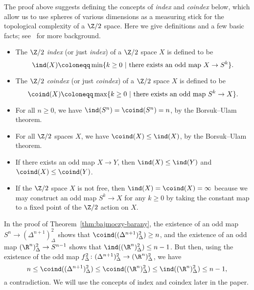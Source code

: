 \documentclass[11pt, reqno, english]{amsart}
\begin{document}
The proof above suggests defining the concepts of \emph{index} and \emph{coindex} below, which allow us to use spheres of various dimensions as a measuring stick for the topological complexity of a $\Z/2$ space.
Here we give definitions and a few basic facts; see~\cite[Chapter 5]{matousek2003using} for more background.
\begin{itemize}
\item
The \emph{$\Z/2$ index} (or just \emph{index}) of a $\Z/2$ space $X$ is defined to be
\[\ind(X)\coloneqq \min\{k\geq 0 ~|~ \text{there exists an odd map } X\to S^k\}.\]
\item
The \emph{$\Z/2$ coindex} (or just \emph{coindex}) of a $\Z/2$ space $X$ is defined to be
\[\coind(X)\coloneqq \max\{k\geq 0 ~|~ \text{there exists an odd map } S^k\to X\}.\]
\item
For all $n \ge 0$, we have $\ind(S^{n}) = \coind(S^{n}) = n$, by the Borsuk--Ulam theorem.
\item
For all $\Z/2$ spaces $X$, we have $\coind(X) \le \ind(X)$, by the Borsuk--Ulam theorem.
\item
If there exists an odd map $X \to Y$, then $\ind(X) \le \ind(Y)$ and $\coind(X) \le \coind(Y)$.
\item
If the $\Z/2$ space $X$ is not free, then $\ind(X)=\coind(X) = \infty$ because we may construct an odd map $S^{k} \to X$ for any $k \ge 0$ by taking the constant map to a fixed point of the $\Z/2$ action on $X$.
\end{itemize}
In the proof of Theorem~\ref{thm:bajmoczy-barany}, the existence of an odd map $S^{n} \to (\Delta^{n + 1})^{2}_{\Delta}$ shows that $\coind((\Delta^{n + 1})^{2}_{\Delta}) \ge n$, and the existence of an odd map $(\R^{n})^{2}_{\Delta} \to S^{n - 1}$ shows that $\ind((\R^{n})^{2}_{\Delta}) \le n - 1$.
But then, using the existence of the odd map $f^{2}_{\Delta} \colon (\Delta^{n + 1})^{2}_{\Delta} \to (\R^{n})^{2}_{\Delta}$, we have
\begin{equation*}
n \le \coind((\Delta^{n + 1})^{2}_{\Delta}) \le \coind((\R^{n})^{2}_{\Delta}) \le \ind((\R^{n})^{2}_{\Delta}) \le n - 1,
\end{equation*}
a contradiction.
We will use the concepts of index and coindex later in the paper.
\end{document}
